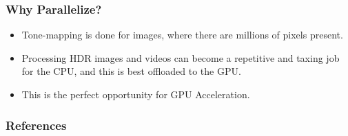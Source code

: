\documentclass{beamer}
\begin{document}
\begin{frame}
    \frametitle{Why Parallelize?}
    \begin{itemize}
        \item Tone-mapping is done for images, where there are millions of pixels present.
        \item Processing HDR images and videos can become a repetitive and taxing job for the CPU, and this is best offloaded to the GPU.
        \item This is the perfect opportunity for GPU Acceleration.
    \end{itemize}
    

\end{frame}

\begin{frame}
    \frametitle{References}
    \begin{thebibliography}{00}
    \end{thebibliography}    

\end{frame}
\end{document}
